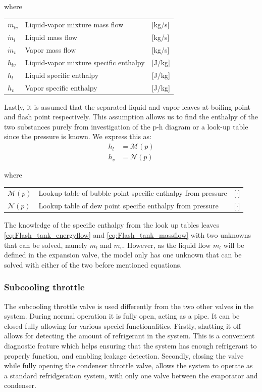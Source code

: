 where
\smallskip
\begin{center}
	\begin{tabular}{l p{8cm} l}
		$\dot{m}_{lv}$			&  Liquid-vapor mixture mass flow			& [\si{kg}/\si{s}]\\
		$\dot{m}_{l}$			&  Liquid mass flow 						& [\si{kg}/\si{s}] \\
		$\dot{m}_{v}$			&  Vapor mass flow							& [\si{kg}/\si{s}]\\
		$h_{lv}$				&  Liquid-vapor mixture specific enthalpy	& [\si{J}/\si{kg}]\\
		$h_{l}$					&  Liquid specific enthalpy 				& [\si{J}/\si{kg}] \\
		$h_{v}$					&  Vapor specific enthalpy					& [\si{J}/\si{kg}]\\
	\end{tabular}
\end{center}

\medskip
Lastly, it is assumed that the separated liquid and vapor leaves at boiling point and flash point respectively. This assumption allows us to find the enthalpy of the two substances purely from investigation of the p-h diagram or a look-up table since the pressure is known. We express this as:
\begin{align}
	h_{l}  & = \mathcal{M}(p)\\
	h_{v}  & = \mathcal{N}(p)
\end{align}

where
\smallskip
\begin{center}
	\begin{tabular}{l p{10cm} l}
		$\mathcal{M}(p)$ & Lookup table of bubble point specific enthalpy from pressure & [$\cdot$] \\
		$\mathcal{N}(p)$ & Lookup table of dew point specific enthalpy from pressure    & [$\cdot$]
	\end{tabular}
\end{center}
\medskip
The knowledge of the specific enthalpy from the look up tables leaves \cref{eq:Flash_tank_energyflow} and \cref{eq:Flash_tank_massflow} with two unknowns that can be solved, namely $ m_l $ and $ m_v $. However, as the liquid flow $ m_l $ will be defined in the expansion valve, the model only has one unknown that can be solved with either of the two before mentioned equations.



\subsubsection{Subcooling throttle}
The subcooling throttle valve is used differently from the two other valves in the system. During normal operation it is fully open, acting as a pipe. It can be closed fully allowing for various speciel functionalities. Firstly, shutting it off allows for detecting the amount of refrigerant in the system. This is a convenient diagnostic feature which helps ensuring that the system has enough refrigerant to properly function, and enabling leakage detection. Secondly, closing the valve while fully opening the condenser throttle valve, allows the system to operate as a standard refridgeration system, with only one valve between the evaporator and condenser.



